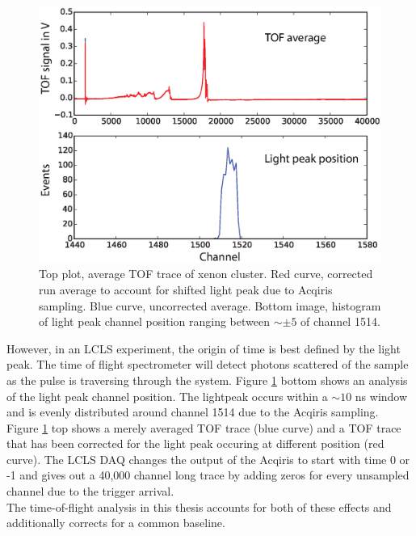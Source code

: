 \begin{figure}
	\centering
		\includegraphics[width=1.00\textwidth]{images/TOF-trace-light-peak.eps}
	\caption[Using light peak to find absolute time zero in Acqiris traces.]{Top plot, average TOF trace of xenon cluster. Red curve, corrected run average to account for shifted light peak due to Acqiris sampling. Blue curve, uncorrected average. Bottom image, histogram of light peak channel position ranging between $\sim\pm 5$ of channel 1514.}
	\label{fig:TOF-trace-light-peak}
\end{figure}
However, in an LCLS experiment, the origin of time is best defined by the light peak. The time of flight spectrometer will detect photons scattered of the sample as the pulse is traversing through the system. Figure \ref{fig:TOF-trace-light-peak} bottom shows an analysis of the light peak channel position. The lightpeak occurs within a $\sim10$ ns window and is evenly distributed around channel 1514 due to the Acqiris sampling. Figure \ref{fig:TOF-trace-light-peak} top shows a merely averaged TOF trace (blue curve) and a TOF trace that has been corrected for the light peak occuring at different position (red curve). The LCLS DAQ changes the output of the Acqiris to start with time 0 or -1 and gives out a 40,000 channel long trace by adding zeros for every unsampled channel due to the trigger arrival.\\
The time-of-flight analysis in this thesis accounts for both of these effects and additionally corrects for a common baseline.
%
%
%
